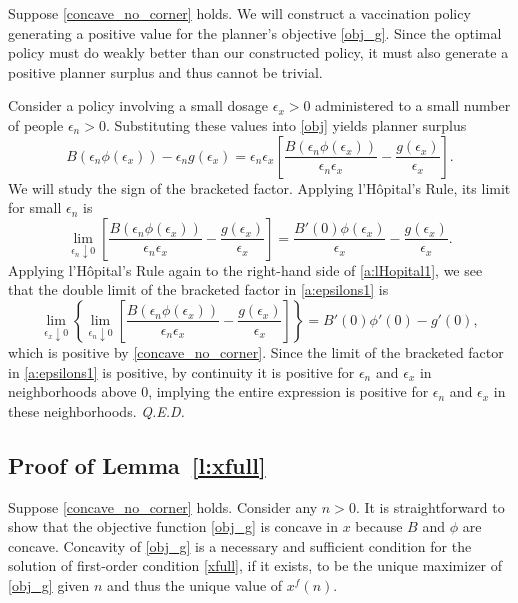 \documentclass[12pt]{article}
\renewcommand{\qed}{{\it Q.E.D.}}
\newcommand{\efficacy}{\phi}
\newcommand{\general}{g}
\newcommand{\benefit}{B}
\newcommand{\xfull}{x^{f\!}}
\newcommand{\ex}{\epsilon_x}
\newcommand{\en}{\epsilon_n}
\begin{document}
Suppose \eqref{concave_no_corner} holds. We will construct a
vaccination policy generating a positive value for the planner's
objective \eqref{obj_g}. Since the optimal policy must do weakly
better than our constructed policy, it must also generate a positive
planner surplus and thus cannot be trivial.

Consider a policy involving a small dosage $\ex > 0$ administered to a
small number of people $\en > 0$. Substituting these values into
\eqref{obj} yields planner surplus
\begin{equation}
\label{a:epsilons1}
\benefit(\en \efficacy(\ex)) - \en \general(\ex) = \en \ex \left[
  \frac{\benefit(\en \efficacy(\ex))}{\en \ex} -
  \frac{\general(\ex)}{\ex} \right].
\end{equation}
We will study the sign of the bracketed factor. Applying
l'H\^{o}pital's Rule, its limit for small $\en$ is
\begin{equation}
\label{a:lHopital1}
\lim_{\en \downarrow 0} \left[ \frac{\benefit(\en \efficacy(\ex))}{\en
    \ex} - \frac{\general(\ex)}{\ex} \right] = \frac{\benefit'(0)
  \efficacy(\ex)}{\ex} - \frac{\general(\ex)}{\ex}.
\end{equation}
Applying l'H\^{o}pital's Rule again to the right-hand side of
\eqref{a:lHopital1}, we see that the double limit of the bracketed
factor in \eqref{a:epsilons1} is
\begin{equation}
\label{a:lHopital2}
\lim_{\ex \downarrow 0} \left\{ \lim_{\en \downarrow 0} \left[
  \frac{\benefit(\en \efficacy(\ex))}{\en \ex} - \frac{\general(\ex)}{\ex} \right] \right\}= \benefit'(0) \efficacy'(0) - \general'(0),
\end{equation}
which is positive by \eqref{concave_no_corner}. Since the limit of the
bracketed factor in \eqref{a:epsilons1} is positive, by continuity it
is positive for $\en$ and $\ex$ in neighborhoods above 0, implying the
entire expression is positive for $\en$ and $\ex$ in these
neighborhoods. \qed


\subsection*{Proof of Lemma~\ref{l:xfull}}

Suppose \eqref{concave_no_corner} holds. Consider any $n > 0$. It is
straightforward to show that the objective function \eqref{obj_g} is
concave in $x$ because $\benefit$ and $\efficacy$ are
concave. Concavity of \eqref{obj_g} is a necessary and sufficient
condition for the solution of first-order condition \eqref{xfull}, if
it exists, to be the unique maximizer of \eqref{obj_g} given $n$ and
thus the unique value of $\xfull(n)$.
\end{document}
